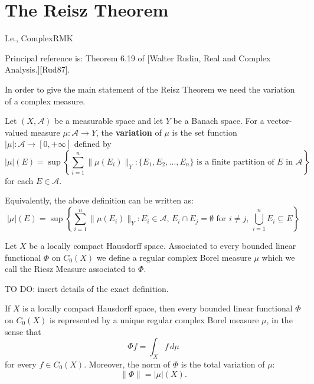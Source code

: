 \chapter{The Reisz Theorem}

I.e., ComplexRMK

Principal reference is: Theorem 6.19 of [Walter Rudin, Real and Complex Analysis.][Rud87].

In order to give the main statement of the Reisz Theorem we need the variation of a complex measure.

\begin{definition}
  \label{def:variation}
  \leanok
  Let $(X, \mathcal{A})$ be a measurable space and let $Y$ be a Banach space. For a vector-valued measure $\mu: \mathcal{A} \to Y$, the \textbf{variation} of $\mu$ is the set function $|\mu|: \mathcal{A} \to [0, +\infty]$ defined by
  \begin{equation*}
    |\mu|(E) = \sup \left\{ \sum_{i=1}^n \|\mu(E_i)\|_Y : \{E_1, E_2, \ldots, E_n\} \text{ is a finite partition of } E \text{ in } \mathcal{A} \right\}
  \end{equation*}
  for each $E \in \mathcal{A}$.
\end{definition}

Equivalently, the above definition can be written as:
\begin{equation*}
  |\mu|(E) = \sup \left\{ \sum_{i=1}^n \|\mu(E_i)\|_Y : E_i \in \mathcal{A}, \, E_i \cap E_j = \emptyset \text{ for } i \neq j, \, \bigcup_{i=1}^n E_i \subseteq E \right\}
\end{equation*}

\begin{definition}
  \label{def:riesz_measure}
  Let $X$ be a locally compact Hausdorff space.
  Associated to every bounded linear functional $\Phi$ on $C_0(X)$ we define a regular complex Borel measure $\mu$ which we call the Riesz Measure associated to $\Phi$.

  TO DO: insert details of the exact definition.
\end{definition}

\begin{theorem}[Rudin 6.19]
  If $X$ is a locally compact Hausdorff space, then every bounded linear functional $\Phi$ on $C_0(X)$ is represented by a unique regular complex Borel measure $\mu$, in the sense that
  \begin{equation}
    \Phi f = \int_X f \, d\mu \tag{1}
  \end{equation}
  for every $f \in C_0(X)$. Moreover, the norm of $\Phi$ is the total variation of $\mu$:
  \begin{equation}
    \|\Phi\| = |\mu|(X). \tag{2}
  \end{equation}
\end{theorem}

